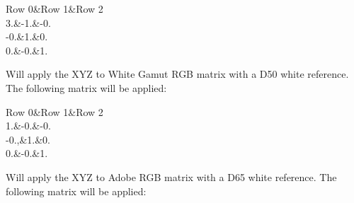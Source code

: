 \begin{Desc}
\begin{description}
\begin{TabularC}{3}
\hline
Row 0&Row 1&Row 2 \\
3.&-\/1.&-\/0. \\
-\/0.&1.&0. \\
0.&-\/0.&1. \\
\end{TabularC}
\item[{\em 
\hypertarget{group___common_interface_gga0892ed0e7e5949707e49bb7d584f8478a7c8be4599e35eb7af44bfa502dadcd71}{ctocmm\+X\+Y\+Z\+To\+Wide\+Gamut\+R\+G\+B\+\_\+\+D50}\label{group___common_interface_gga0892ed0e7e5949707e49bb7d584f8478a7c8be4599e35eb7af44bfa502dadcd71}
}]Will apply the X\+Y\+Z to White Gamut R\+G\+B matrix with a D50 white reference. The following matrix will be applied\+:

\begin{TabularC}{3}
\hline
Row 0&Row 1&Row 2 \\
1.&-\/0.&-\/0. \\
-\/0.,&1.&0. \\
0.&-\/0.&1. \\
\end{TabularC}
\item[{\em 
\hypertarget{group___common_interface_gga0892ed0e7e5949707e49bb7d584f8478a8b44b475361ac45ed09a9b9fe922df76}{ctocmm\+X\+Y\+Z\+To\+Adobe\+R\+G\+B\+\_\+\+D65}\label{group___common_interface_gga0892ed0e7e5949707e49bb7d584f8478a8b44b475361ac45ed09a9b9fe922df76}
}]Will apply the X\+Y\+Z to Adobe R\+G\+B matrix with a D65 white reference. The following matrix will be applied\+:


\end{description}
\end{Desc}
